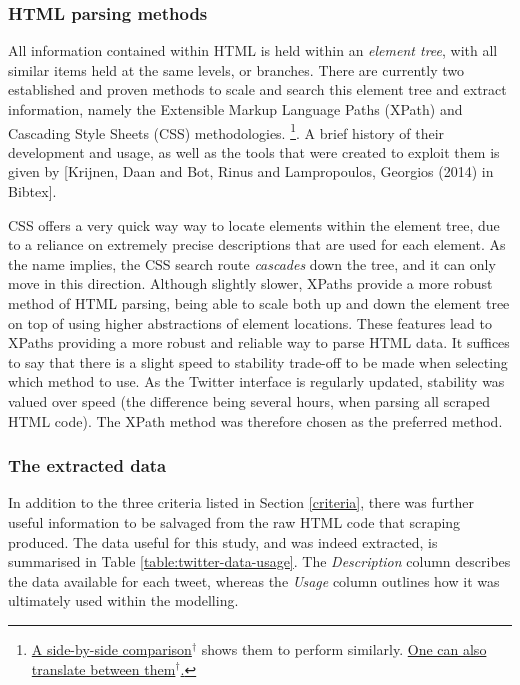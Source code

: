 \documentclass{article}
\begin{document}
\subsubsection{HTML parsing methods}
\label{sec-3-4-1}

All information contained within HTML is held within an \emph{element tree}, with all similar items held at the same levels, or branches.
There are currently two established and proven methods to scale and search this element tree and extract information, namely the Extensible Markup Language Paths (XPath) and Cascading Style Sheets (CSS) methodologies. \footnote{\href{http://elementalselenium.com/tips/32-xpath-vs-css}{A side-by-side comparison$^{\dag{}}$} shows them to perform similarly. \href{http://saucelabs.com/resources/selenium/css-selectors}{One can also translate between them$^{\dag{}}$.}}. A brief history of their development and usage, as well as the tools that were created to exploit them is given by [Krijnen, Daan and Bot, Rinus and Lampropoulos, Georgios (2014) in Bibtex].

CSS offers a very quick way way to locate elements within the element tree, due to a reliance on extremely precise descriptions that are used for each element. As the name implies, the CSS search route \emph{cascades} down the tree, and it can only move in this direction. Although slightly slower, XPaths provide a more robust method of HTML parsing, being able to scale both up and down the element tree on top of using higher abstractions of element locations. These features lead to XPaths providing a more robust and reliable way to parse HTML data. It suffices to say that there is a slight speed to stability trade-off to be made when selecting which method to use. As the Twitter interface is regularly updated, stability was valued over speed (the difference being several hours, when parsing all scraped HTML code). The XPath method was therefore chosen as the preferred method.


\subsubsection{The extracted data}
\label{sec-3-4-2}

In addition to the three criteria listed in Section \ref{criteria}, there was further useful information to be salvaged from the raw HTML code that scraping produced. The data useful for this study, and was indeed extracted, is summarised in Table \ref{table:twitter-data-usage}. The \emph{Description} column describes the data available for each tweet, whereas the \emph{Usage} column outlines how it was ultimately used within the modelling.
\end{document}
